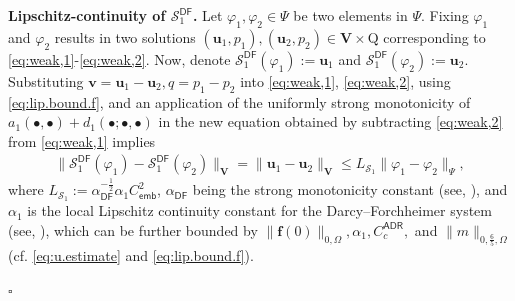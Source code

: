 \documentclass[11pt, reqno, a4paper, twoside]{article}
\newcommand{\bu}{\boldsymbol{u}}
\newcommand{\bv}{\boldsymbol{v}}
\renewcommand{\bf}{\boldsymbol{f}}
\newcommand{\rQ}{\mathrm{Q}}
\newcommand{\bV}{\mathbf{V}}
\newcommand{\cS}{\mathcal{S}}
\newenvironment{proof}{\noindent{\it Proof.}}{\hfill$\square$}
\numberwithin{equation}{section}
\numberwithin{remark}{section}
\numberwithin{figure}{section}
\numberwithin{table}{section}
\begin{document}
{\begin{proof}
\smallskip
\noindent\textbf{Lipschitz-continuity of \(\cS^{\mathsf{DF}}_1\).}
Let \(\varphi_1, \varphi_2\in\Psi\) be two  elements in \(\Psi.\) Fixing \(\varphi_1\) and \(\varphi_2\) results in two  solutions \((\bu_1,p_1), (\bu_2,p_2) \in \bV\times \rQ\) corresponding to   \eqref{eq:weak,1}-\eqref{eq:weak,2}. Now, denote \(\cS^{\mathsf{DF}}_1(\varphi_1):=\bu_1\) and \(\cS^{\mathsf{DF}}_1(\varphi_2):=\bu_2.\) Substituting \(\bv=\bu_1-\bu_2,q=p_1-p_2\) into \eqref{eq:weak,1}, \eqref{eq:weak,2}, {using \eqref{eq:lip.bound.f}, and} an application of  the uniformly strong monotonicity of \(a_1(\bullet,\bullet)+d_1(\bullet;\bullet,\bullet)\) in the new equation obtained by subtracting \eqref{eq:weak,2} from \eqref{eq:weak,1} implies
\begin{align}\label{eq:Lipschitz.S_DF}
    \|\cS_1^{\mathsf{DF}}({\varphi_1})-\cS_1^{\mathsf{DF}}({\varphi_2})\|_{\bV}=\|\bu_1-\bu_2\|_{\bV}\leq L_{\cS_1}\|\varphi_1-\varphi_2\|_{\Psi},
\end{align}
where {\(L_{\cS_1}:=\alpha^{-\frac12}_{\mathsf{DF}}{\alpha_1}C^2_{\mathsf{emb}}\), \(\alpha_{\mathsf{DF}}\)} being the strong monotonicity constant (see, \cite[Equation~3.8]{dhpr_sinum26}), and \(\alpha_1\) is the local Lipschitz continuity constant for  the Darcy--Forchheimer system (see, \cite[Equation~3.7]{dhpr_sinum26}), which can be further bounded by \({\|\bf(0)\|_{0,\Omega}},\alpha_1, C^{\mathsf{ADR}}_{c}, \) and \(\|m\|_{0,\frac65,\Omega}\) (cf.  \eqref{eq:u.estimate} and \eqref{eq:lip.bound.f}).


\end{proof}}
\end{document}
